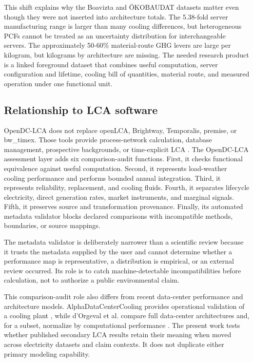\documentclass[review,12pt]{elsarticle}
\begin{document}
This shift explains why the Boavizta and ÖKOBAUDAT datasets matter even though they were not inserted into architecture totals. The 5.38-fold server manufacturing range is larger than many cooling differences, but heterogeneous PCFs cannot be treated as an uncertainty distribution for interchangeable servers. The approximately 50-60\% material-route GHG levers are large per kilogram, but kilograms by architecture are missing. The needed research product is a linked foreground dataset that combines useful computation, server configuration and lifetime, cooling bill of quantities, material route, and measured operation under one functional unit.

\subsection{Relationship to LCA software}
OpenDC-LCA does not replace openLCA, Brightway, Temporalis, premise, or bw\_timex. Those tools provide process-network calculation, database management, prospective backgrounds, or time-explicit LCA \cite{ref27,ref28,ref29,ref37,ref38}. The OpenDC-LCA assessment layer adds six comparison-audit functions. First, it checks functional equivalence against useful computation. Second, it represents load-weather cooling performance and performs bounded annual integration. Third, it represents reliability, replacement, and cooling fluids. Fourth, it separates lifecycle electricity, direct generation rates, market instruments, and marginal signals. Fifth, it preserves source and transformation provenance. Finally, its automated metadata validator blocks declared comparisons with incompatible methods, boundaries, or source mappings.

The metadata validator is deliberately narrower than a scientific review because it trusts the metadata supplied by the user and cannot determine whether a performance map is representative, a distribution is empirical, or an external review occurred. Its role is to catch machine-detectable incompatibilities before calculation, not to authorize a public environmental claim.

This comparison-audit role also differs from recent data-center performance and architecture models. AlphaDataCenterCooling provides operational validation of a cooling plant \cite{ref17}, while d'Orgeval et al. compare full data-center architectures and, for a subset, normalize by computational performance \cite{ref16}. The present work tests whether published secondary LCA results retain their meaning when moved across electricity datasets and claim contexts. It does not duplicate either primary modeling capability.
\end{document}
